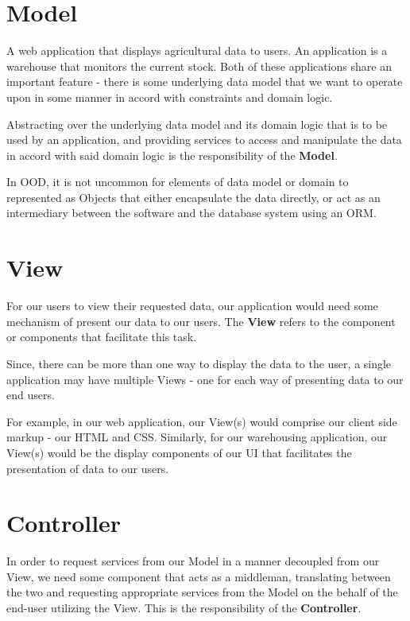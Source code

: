 



\section{Model}

A web application that displays agricultural data to users. An application is a warehouse that monitors the current stock. Both of these applications share an important feature - there is some underlying data model that we want to operate upon in some manner in accord with constraints and  domain logic. 

Abstracting over the underlying data model and its domain logic that is to be used by an application, and providing services to access and manipulate the data in accord with said domain logic is the responsibility of the \textbf{Model}.

In OOD, it is not uncommon for elements of data model or domain to represented as Objects that either encapsulate the data directly, or act as an intermediary between the software and the database system using an ORM.


\section{View}

For our users to view their requested data, our application would need some mechanism of present our data to our users. The \textbf{View} refers to the component or components that facilitate this task. 

Since, there can be more than one way to display the data to the user, a single application may have multiple Views - one for each way of presenting data to our end users.

For example, in our web application, our View(s) would comprise our client side markup - our HTML and CSS. Similarly, for our warehousing application, our View(s) would be the display components of our UI that facilitates the presentation of data to our users.

\section{Controller}

In order to request services from our Model in a manner decoupled from our View, we need some component that acts as a middleman, translating between the two and requesting appropriate services from the Model on the behalf of the end-user utilizing the View. This is the responsibility of the \textbf{Controller}.

